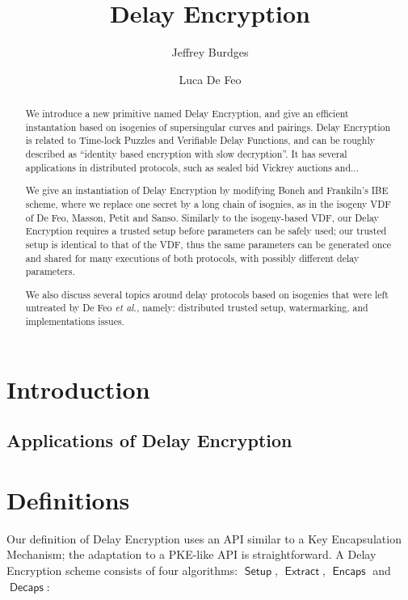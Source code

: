 \documentclass{llncs}
\title{Delay Encryption}
\author{Jeffrey Burdges\inst{1}
  \and
  Luca De Feo\inst{2}\orcidID{0000-0002-9321-0773}}
\institute{
  Web 3, Switzerland
  \and
  IBM Research Zürich, Switzerland
}
\DeclareMathOperator{\Setup}{\mathsf{Setup}}
\DeclareMathOperator{\Extract}{\mathsf{Extract}}
\DeclareMathOperator{\Encaps}{\mathsf{Encaps}}
\DeclareMathOperator{\Decaps}{\mathsf{Decaps}}
\begin{document}
\maketitle

\begin{abstract}
  We introduce a new primitive named Delay Encryption, and give an
  efficient instantation based on isogenies of supersingular curves
  and pairings. %
  Delay Encryption is related to Time-lock Puzzles and Verifiable
  Delay Functions, and can be roughly described as ``identity based
  encryption with slow decryption''. %
  It has several applications in distributed protocols, such as
  sealed bid Vickrey auctions and...

  We give an instantiation of Delay Encryption by modifying Boneh and
  Frankiln's IBE scheme, where we replace one secret by a long chain
  of isognies, as in the isogeny VDF of De Feo, Masson, Petit and
  Sanso. %
  Similarly to the isogeny-based VDF, our Delay Encryption requires a
  trusted setup before parameters can be safely used; our trusted
  setup is identical to that of the VDF, thus the same parameters can
  be generated once and shared for many executions of both protocols,
  with possibly different delay parameters.

  We also discuss several topics around delay protocols
  based on isogenies that were left untreated by De Feo \emph{et al.},
  namely: distributed trusted setup, watermarking, and implementations
  issues.
\end{abstract}

\section{Introduction}
\label{sec:introduction}


\subsection{Applications of Delay Encryption}


\section{Definitions}
\label{sec:definitions}

Our definition of Delay Encryption uses an API similar to a Key
Encapsulation Mechanism; the adaptation to a PKE-like API is
straightforward. A Delay Encryption scheme consists of four
algorithms: $\Setup$, $\Extract$, $\Encaps$ and $\Decaps$:
\end{document}
